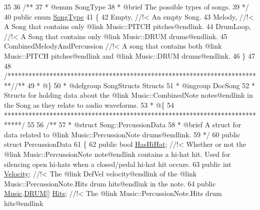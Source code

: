 \begin{DoxyCodeInclude}
35 \textcolor{comment}{}
36 \textcolor{comment}{    /**}
37 \textcolor{comment}{     * @enum SongType}
38 \textcolor{comment}{     * @brief The possible types of songs.}
39 \textcolor{comment}{    */}
40     \textcolor{keyword}{public} \textcolor{keyword}{enum} \hyperlink{group___song_enums_gae681a1f001333e39fc1cb4fea97bfe1b}{SongType}
41     \{
42         Empty, \textcolor{comment}{//!< An empty Song. }
43 \textcolor{comment}{}        Melody, \textcolor{comment}{//!< A Song that contains only @link Music::PITCH pitches@endlink.}
44 \textcolor{comment}{}        DrumLoop, \textcolor{comment}{//!< A Song that contains only @link Music::DRUM drums@endlink.}
45 \textcolor{comment}{}        CombinedMelodyAndPercussion \textcolor{comment}{//!< A song that contains both @link Music::PITCH pitches@endlink and
       @link Music::DRUM drums@endlink.}
46 \textcolor{comment}{}    \}
47 
48     \textcolor{comment}{/*************************************************************************/}\textcolor{comment}{/** }
49 \textcolor{comment}{     * @\}}
50 \textcolor{comment}{     * @defgroup SongStructs Structs}
51 \textcolor{comment}{     * @ingroup DocSong}
52 \textcolor{comment}{     * Structs for holding data about the @link Music::CombinedNote notes@endlink in the Song as they
       relate to audio waveforms.}
53 \textcolor{comment}{     * @\{}
54 \textcolor{comment}{    *****************************************************************************/}
55 \textcolor{comment}{}
56 \textcolor{comment}{    /**}
57 \textcolor{comment}{     * @struct Song::PercussionData}
58 \textcolor{comment}{     * @brief A struct for data related to @link Music::PercussionNote drums@endlink.}
59 \textcolor{comment}{    */}
60     \textcolor{keyword}{public} \textcolor{keyword}{struct }PercussionData
61     \{
62         \textcolor{keyword}{public} \textcolor{keywordtype}{bool} \hyperlink{group___song_structs_a0487a8cb56e5454ea46c9c42e55033eb}{HasHiHat}; \textcolor{comment}{//!< Whether or not the @link Music::PercussionNote note@endlink
       contains a hi-hat hit. Used for silencing open hi-hats when a closed/pedal hi-hat hit occurs.  }
63 \textcolor{comment}{}        \textcolor{keyword}{public} \textcolor{keywordtype}{int} \hyperlink{group___song_structs_ad3e20aaef3edeeb78a01522adb218797}{Velocity}; \textcolor{comment}{//!< The @link DefVel velocity@endlink of the @link
       Music::PercussionNote.Hits drum hits@endlink in the note.}
64 \textcolor{comment}{}        \textcolor{keyword}{public} \hyperlink{class_music}{Music}.\hyperlink{group___music_enums_gade475b4382c7066d1af13e7c13c029b6}{DRUM}[] \hyperlink{group___song_structs_ac8a09dee6f5d73d31bd91e5df71d65ff}{Hits}; \textcolor{comment}{//!< The @link Music::PercussionNote.Hits drum hits@endlink
}
\end{DoxyCodeInclude}
